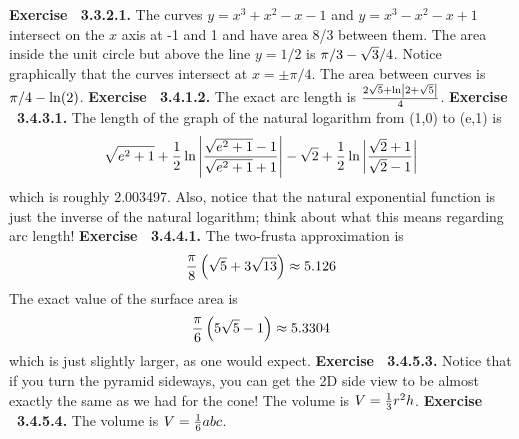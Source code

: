  {\noindent \protect \bf  Exercise ~3.3.2.1.} \textbullet The curves $y=x^3+x^2-x-1$ and $y=x^3-x^2-x+1$ intersect on the $x$ axis at -1 and 1 and have area 8/3 between them. \textbullet The area inside the unit circle but above the line $y=1/2$ is $\pi /3-\protect \sqrt  {3}/4$. \textbullet Notice graphically that the curves intersect at $x=\pm \pi /4$. The area between curves is $\pi /4-\protect \qopname  \relax o{ln}(2)$. \protect \newline  \protect \newline  
 {\noindent \protect \bf  Exercise ~3.4.1.2.} The exact arc length is $\protect \frac  {2\protect \sqrt  {5}+\protect \qopname  \relax o{ln}\left | 2+\protect \sqrt  {5}\right |}{4}$. \protect \newline  \protect \newline  
 {\noindent \protect \bf  Exercise ~3.4.3.1.} The length of the graph of the natural logarithm from (1,0) to (e,1) is $$\protect \sqrt  {e^2+1}+\protect \frac  {1}{2}\protect \qopname  \relax o{ln}\left | \protect \frac  {\protect \sqrt  {e^2+1}-1}{\protect \sqrt  {e^2+1}+1}\right |-\protect \sqrt  {2}+\protect \frac  {1}{2}\protect \qopname  \relax o{ln}\left | \protect \frac  {\protect \sqrt  {2}+1}{\protect \sqrt  {2}-1}\right | $$ which is roughly 2.003497. Also, notice that the natural exponential function is just the inverse of the natural logarithm; think about what this means regarding arc length! \protect \newline  \protect \newline  
 {\noindent \protect \bf  Exercise ~3.4.4.1.} The two-frusta approximation is $$\protect \frac  {\pi }{8}\left (\protect \sqrt  {5}+3\protect \sqrt  {13} \right )\approx 5.126 $$ The exact value of the surface area is $$\protect \frac  {\pi }{6}\left (5\protect \sqrt  {5}-1 \right )\approx 5.3304 $$ which is just slightly larger, as one would expect.  \protect \newline  \protect \newline  
 {\noindent \protect \bf  Exercise ~3.4.5.3.} Notice that if you turn the pyramid sideways, you can get the 2D side view to be almost exactly the same as we had for the cone! The volume is $V=\protect \frac  {1}{3}r^2h$. \protect \newline  \protect \newline  
 {\noindent \protect \bf  Exercise ~3.4.5.4.} The volume is $V=\protect \frac  {1}{6}abc$. \protect \newline  \protect \newline  
